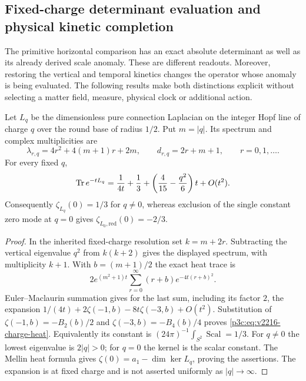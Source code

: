 \documentclass[12pt,a4paper]{article}
\begin{document}
\subsection{Fixed-charge determinant evaluation and physical kinetic completion}
\label{p3c:sec:v2216-fixed-charge-completion}

The primitive horizontal comparison has an exact absolute determinant as
well as its already derived scale anomaly.  These are different readouts.
Moreover, restoring the vertical and temporal kinetics changes the operator
whose anomaly is being evaluated.  The following results make both
distinctions explicit without selecting a matter field, measure, physical
clock or additional action.

\begin{theorem}
\label{p3c:thm:v2216-all-charge-zeta}
Let $L_q$ be the dimensionless pure connection Laplacian on the integer
Hopf line of charge $q$ over the round base of radius $1/2$.  Put
$m=|q|$.  Its spectrum and complex multiplicities are
\[
 \lambda_{r,q}=4r^2+4(m+1)r+2m,\qquad
 d_{r,q}=2r+m+1,\qquad r=0,1,\ldots .
\]
For every fixed $q$,
\begin{equation}
 \operatorname{Tr} e^{-tL_q}=\frac1{4t}+\frac13+
       \left(\frac4{15}-\frac{q^2}{6}\right)t+O(t^2).
 \label{p3c:eq:v2216-charge-heat}
\end{equation}
Consequently $\zeta_{L_q}(0)=1/3$ for $q\ne0$, whereas exclusion of
the single constant zero mode at $q=0$ gives
$\zeta_{L_0,\mathrm{red}}(0)=-2/3$.
\end{theorem}
\begin{proof}
In the inherited fixed-charge resolution set $k=m+2r$.  Subtracting the
vertical eigenvalue $q^2$ from $k(k+2)$ gives the displayed spectrum,
with multiplicity $k+1$.  With $b=(m+1)/2$ the exact heat trace is
\[
 2e^{(m^2+1)t}\sum_{r=0}^{\infty}(r+b)e^{-4t(r+b)^2}.
\]
Euler--Maclaurin summation gives for the last sum, including its factor
$2$, the expansion $1/(4t)+2\zeta(-1,b)-8t\zeta(-3,b)+O(t^2)$.
Substitution of $\zeta(-1,b)=-B_2(b)/2$ and
$\zeta(-3,b)=-B_4(b)/4$ proves
\eqref{p3c:eq:v2216-charge-heat}.  Equivalently its constant is
$(24\pi)^{-1}\int_{S^2}\operatorname{Scal}=1/3$.
For $q\ne0$ the lowest eigenvalue is $2|q|>0$; for $q=0$ the
kernel is the scalar constant.  The Mellin heat formula gives
$\zeta(0)=a_1-\dim\ker L_q$, proving the assertions.  The expansion
is at fixed charge and is not asserted uniformly as $|q|\to\infty$.
\end{proof}
\end{document}
